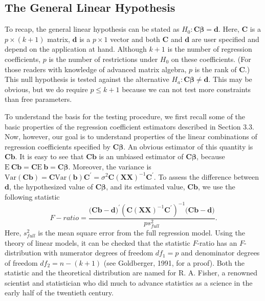 \subsection{The General Linear Hypothesis}

To recap, the general linear hypothesis can be stated as
$H_0:\mathbf{C \boldsymbol \beta =d}$. Here, $\mathbf{C}$ is a
$p\times (k+1)$ matrix, $\mathbf{d}$ is a $p\times 1$ vector and
both $\mathbf{C}$ and $\mathbf{d}$ are user specified and depend on
the application at hand. Although $k+1$ is the number of regression
coefficients, $p$ is the number of restrictions under $H_0$ on these
coefficients. (For those readers with knowledge of advanced matrix
algebra, $p$ is the rank of $\mathbf{C}$.) This null hypothesis is
tested against the alternative $H_a:\mathbf{C \boldsymbol \beta \neq
d}$. This may be obvious, but we do require $p \leq k+1$ because we
can not test more constraints than free parameters.

To understand the basis for the testing procedure, we first recall
some of the basic properties of the regression coefficient
estimators described in Section 3.3. Now, however, our goal is to
understand properties of the linear combinations of regression
coefficients specified by $\mathbf{C\boldsymbol \beta } $. An
obvious estimator of this quantity is $\mathbf{Cb}$. It is easy to
see that $\mathbf{Cb}$ is an unbiased estimator of
$\mathbf{C\boldsymbol \beta }$, because $
\mathrm{E~}\mathbf{Cb=C}\mathrm{E~}\mathbf{b=C\boldsymbol \beta }$.
Moreover, the
variance is $\mathrm{Var}\left( \mathbf{Cb}\right) \mathbf{=C}\mathrm{Var}%
\left( \mathbf{b}\right) \mathbf{C}^{\prime }=\sigma
^{2}\mathbf{C}\left( \mathbf{XX}\right) ^{-1}\mathbf{C}^{\prime }$.
To assess the difference between $\mathbf{d}$, the hypothesized
value of $\mathbf{C \boldsymbol \beta }$, and its
estimated value, $\mathbf{Cb}$, we use the following statistic%
\begin{equation}
F-ratio=\frac{(\mathbf{Cb-d)}^{\prime }\left( \mathbf{C}\left( \mathbf{XX}%
\right) ^{-1}\mathbf{C}^{\prime }\right) ^{-1}(\mathbf{Cb-d)}}{ps_{full}^{2}}%
.  \label{E4:GenLinHypF-ratio}
\end{equation}%
Here, $s_{full}^{2}$ is the mean square error from the full
regression model. Using the theory of linear models, it can be
checked that the statistic $F$-ratio has an $F$-distribution with
numerator degrees of freedom $df_1=p$ and denominator degrees of
freedom $df_2=n-(k+1)$ (see Goldberger, 1991, for a proof). Both the
statistic and the theoretical distribution are named for R. A.
Fisher, a renowned scientist and statistician who did much to
advance statistics as a science in the early half of the twentieth
century.

